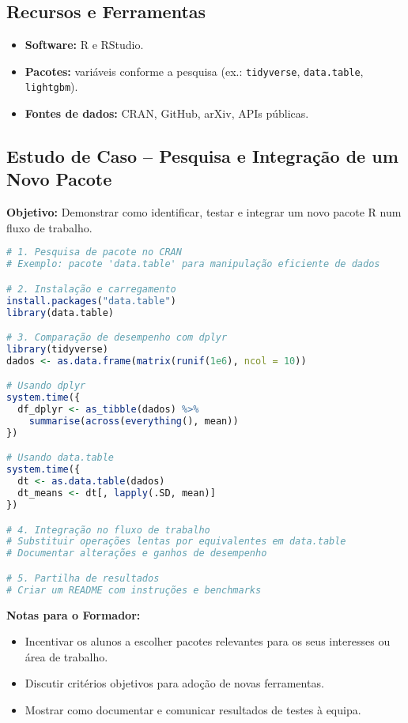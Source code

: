 \subsection{\textcolor{subsectionblue}{Recursos e Ferramentas}}
\begin{itemize}
  \item \textbf{Software:} R e RStudio.
  \item \textbf{Pacotes:} variáveis conforme a pesquisa (ex.: \texttt{tidyverse}, \texttt{data.table}, \texttt{lightgbm}).
  \item \textbf{Fontes de dados:} CRAN, GitHub, arXiv, APIs públicas.
\end{itemize}

\subsection{\textcolor{subsectionblue}{Estudo de Caso – Pesquisa e Integração de um Novo Pacote}}
\textbf{Objetivo:} Demonstrar como identificar, testar e integrar um novo pacote R num fluxo de trabalho.

\begin{lstlisting}[language=R]
# 1. Pesquisa de pacote no CRAN
# Exemplo: pacote 'data.table' para manipulação eficiente de dados

# 2. Instalação e carregamento
install.packages("data.table")
library(data.table)

# 3. Comparação de desempenho com dplyr
library(tidyverse)
dados <- as.data.frame(matrix(runif(1e6), ncol = 10))

# Usando dplyr
system.time({
  df_dplyr <- as_tibble(dados) %>%
    summarise(across(everything(), mean))
})

# Usando data.table
system.time({
  dt <- as.data.table(dados)
  dt_means <- dt[, lapply(.SD, mean)]
})

# 4. Integração no fluxo de trabalho
# Substituir operações lentas por equivalentes em data.table
# Documentar alterações e ganhos de desempenho

# 5. Partilha de resultados
# Criar um README com instruções e benchmarks
\end{lstlisting}

\textbf{Notas para o Formador:}
\begin{itemize}
  \item Incentivar os alunos a escolher pacotes relevantes para os seus interesses ou área de trabalho.
  \item Discutir critérios objetivos para adoção de novas ferramentas.
  \item Mostrar como documentar e comunicar resultados de testes à equipa.
\end{itemize}

